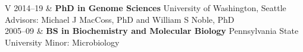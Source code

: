 \documentclass[11pt]{article}
\begin{document}
\cvheader



\begin{tabular}{V}
  2014--19 & {\bf PhD in Genome Sciences}
             \newline University of Washington, Seattle
             \newline Advisors: Michael J MacCoss, PhD and William S Noble, PhD\\
  2005--09 & {\bf BS in Biochemistry and Molecular Biology}
             \newline Pennsylvania State University
             \newline Minor: Microbiology\\
\end{tabular}

\end{document}
